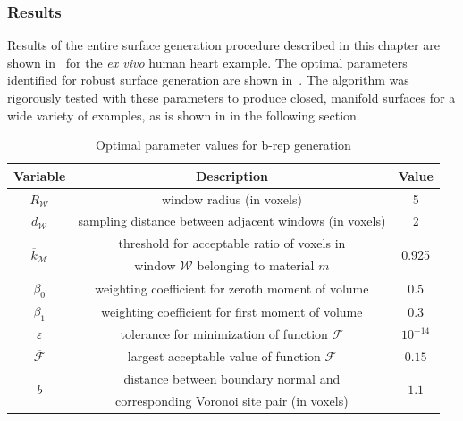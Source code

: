 \subsubsection{Results}

Results of the entire surface generation procedure described in this chapter are shown in~ for the \textit{ex vivo} human heart example. The optimal parameters identified for robust surface generation are shown in~. The algorithm was rigorously tested with these parameters to produce closed, manifold surfaces for a wide variety of examples, as is shown in in the following section.

\begin{table}[]
 \centering
   \begin{tabular}{|c||c|c|}
   \hline 
   \textbf{Variable} & \textbf{Description} & \textbf{Value} \\ \hline \hline
   $R_{\mathcal{W}}$ & window radius (in voxels) & 5 \\ \hline
   $d_{\mathcal{W}}$ & sampling distance between adjacent windows (in voxels) & 2 \\ \hline
   \multirow{2}{*}{$\overline{k}_{\mathcal{M}}$ \rule{0mm}{4mm}} & threshold for acceptable ratio of voxels in & \multirow{2}{*}{0.925} \\
   {} & window $\mathcal{W}$ belonging to material $m$ & {} \\ \hline
   $\beta_0$ & weighting coefficient for zeroth moment of volume & 0.5 \\ \hline
   $\beta_1$ & weighting coefficient for first moment of volume & 0.3 \\ \hline   
   $\varepsilon$ & tolerance for minimization of function $\mathcal{F}$ & $10^{-14}$ \rule{0mm}{4mm} \\ \hline
   $\overline{\mathcal{F}}$ \rule{0mm}{4mm} & largest acceptable value of function $\mathcal{F}$ & $0.15$ \\ \hline
   \multirow{2}{*}{$b$} & distance between boundary normal and & \multirow{2}{*}{$1.1$} \\
   {} & corresponding Voronoi site pair (in voxels) & {} \\ \hline
\end{tabular}
\caption{Optimal parameter values for b-rep generation}
\label{tab:Mod5}
\end{table}

